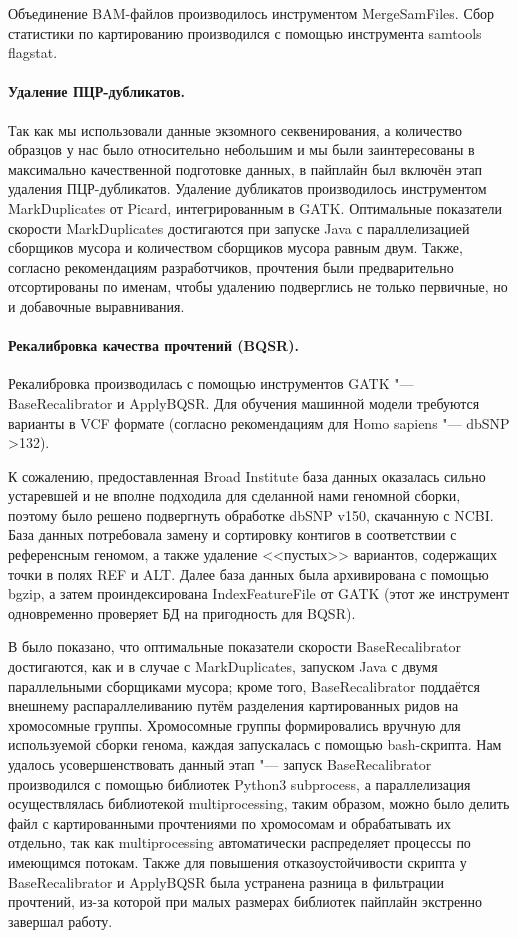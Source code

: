 \documentclass[a4paper,12pt]{article}
\begin{document}
Объединение BAM-файлов производилось инструментом MergeSamFiles.
Сбор статистики по картированию производился с помощью инструмента samtools flagstat.

\paragraph{Удаление ПЦР-дубликатов.}
Так как мы использовали данные экзомного секвенирования, а количество образцов у нас было относительно небольшим и мы были заинтересованы в максимально качественной подготовке данных, в пайплайн был включён этап удаления ПЦР-дубликатов.
Удаление дубликатов производилось инструментом MarkDuplicates от Picard\cite{picard}, интегрированным в GATK.
Оптимальные показатели скорости MarkDuplicates достигаются при запуске Java с параллелизацией сборщиков мусора и количеством сборщиков мусора равным двум\cite{heldenbrand}.
Также, согласно рекомендациям разработчиков, прочтения были предварительно отсортированы по именам, чтобы удалению подверглись не только первичные, но и добавочные выравнивания\cite{gatk}.

\paragraph{Рекалибровка качества прочтений (BQSR).}
Рекалибровка производилась с помощью инструментов GATK "--- BaseRecalibrator и ApplyBQSR.
Для обучения машинной модели требуются варианты в VCF формате (согласно рекомендациям для Homo sapiens "--- dbSNP >132).

К сожалению, предоставленная Broad Institute база данных оказалась сильно устаревшей и не вполне подходила для сделанной нами геномной сборки, поэтому было решено подвергнуть обработке dbSNP v150, скачанную с NCBI\cite{dbsnp}.
База данных потребовала замену и сортировку контигов в соответствии с референсным геномом, а также удаление <<пустых>> вариантов, содержащих точки в полях REF и ALT.
Далее база данных была архивирована с помощью bgzip, а затем проиндексирована IndexFeatureFile от GATK (этот же инструмент одновременно проверяет БД на пригодность для BQSR).

В \cite{heldenbrand} было показано, что оптимальные показатели скорости BaseRecalibrator достигаются, как и в случае с MarkDuplicates, запуском Java с двумя параллельными сборщиками мусора;
кроме того, BaseRecalibrator поддаётся внешнему распараллеливанию путём разделения картированных ридов на хромосомные группы.
Хромосомные группы формировались вручную для используемой сборки генома, каждая запускалась с помощью bash-скрипта.
Нам удалось усовершенствовать данный этап "--- запуск BaseRecalibrator производился с помощью библиотек Python3 subprocess, а параллелизация осуществлялась библиотекой multiprocessing, таким образом, можно было делить файл с картированными прочтениями по хромосомам и обрабатывать их отдельно, так как multiprocessing автоматически распределяет процессы по имеющимся потокам.
Также для повышения отказоустойчивости скрипта у BaseRecalibrator и ApplyBQSR была устранена разница в фильтрации прочтений, из-за которой при малых размерах библиотек пайплайн экстренно завершал работу.
\end{document}
